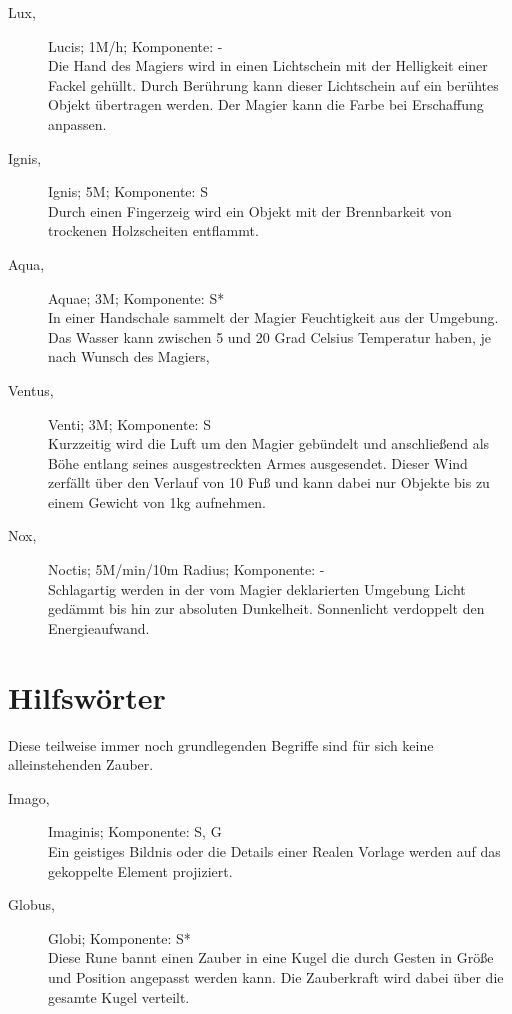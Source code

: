 \documentclass[a4paper,12pt,oneside]{book}
\begin{document}
\begin{description}
\item[Lux,] Lucis; 1M/h; Komponente: -
\\Die Hand des Magiers wird in einen Lichtschein mit der Helligkeit einer Fackel gehüllt. Durch Berührung kann dieser Lichtschein auf ein berühtes Objekt übertragen werden. Der Magier kann die Farbe bei Erschaffung anpassen.
\item[Ignis,] Ignis; 5M; Komponente: S
\\Durch einen Fingerzeig wird ein Objekt mit der Brennbarkeit von trockenen Holzscheiten entflammt.
\item[Aqua,] Aquae; 3M; Komponente: S*
\\In einer Handschale sammelt der Magier Feuchtigkeit aus der Umgebung. Das Wasser kann zwischen 5 und 20 Grad Celsius Temperatur haben, je nach Wunsch des Magiers,
\item[Ventus,] Venti; 3M; Komponente: S
\\Kurzzeitig wird die Luft um den Magier gebündelt und anschließend als Böhe entlang seines ausgestreckten Armes ausgesendet. Dieser Wind zerfällt über den Verlauf von 10 Fuß und kann dabei nur Objekte bis zu einem Gewicht von 1kg aufnehmen.
\item[Nox,] Noctis; 5M/min/10m Radius; Komponente: -
\\Schlagartig werden in der vom Magier deklarierten Umgebung Licht gedämmt bis hin zur absoluten Dunkelheit. Sonnenlicht verdoppelt den Energieaufwand.
\end{description}

\chapter{Hilfswörter}
Diese teilweise immer noch grundlegenden Begriffe sind für sich keine alleinstehenden Zauber.
\begin{description}
\item[Imago,] Imaginis; Komponente: S, G
\\Ein geistiges Bildnis oder die Details einer Realen Vorlage werden auf das gekoppelte Element projiziert.
\item[Globus,] Globi; Komponente: S*
\\Diese Rune bannt einen Zauber in eine Kugel die durch Gesten in Größe und Position angepasst werden kann. Die Zauberkraft wird dabei über die gesamte Kugel verteilt.

\end{description}
\end{document}
